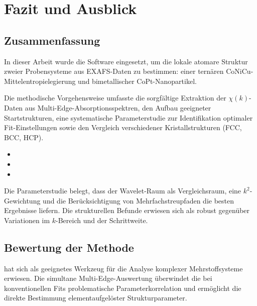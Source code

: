 \chapter{Fazit und Ausblick}
\label{ch:fazit}

\section{Zusammenfassung}

In dieser Arbeit wurde die Software \evax{} eingesetzt, um die lokale
atomare Struktur zweier Probensysteme aus EXAFS-Daten zu bestimmen:
einer ternären CoNiCu-Mittelentropielegierung und bimetallischer
CoPt-Nanopartikel.

Die methodische Vorgehensweise umfasste die sorgfältige Extraktion
der $\chi(k)$-Daten aus Multi-Edge-Absorptionsspektren, den Aufbau
geeigneter Startstrukturen, eine systematische Parameterstudie zur
Identifikation optimaler Fit-Einstellungen sowie den Vergleich
verschiedener Kristallstrukturen (FCC, BCC, HCP).

\begin{itemize}[nosep]
  \item {}
  \item {}
  \item {}
\end{itemize}

Die Parameterstudie belegt, dass der Wavelet-Raum als Vergleichsraum,
eine $k^2$-Gewichtung und die Berücksichtigung von
Mehrfachstreupfaden die besten Ergebnisse liefern.
Die strukturellen Befunde erwiesen sich als robust gegenüber
Variationen im $k$-Bereich und der Schrittweite.

\section{Bewertung der Methode}

\evax{} hat sich als geeignetes Werkzeug für die Analyse komplexer
Mehrstoffsysteme erwiesen.
Die simultane Multi-Edge-Auswertung überwindet die bei konventionellen
Fits problematische Parameterkorrelation und ermöglicht die direkte
Bestimmung elementaufgelöster Strukturparameter.

